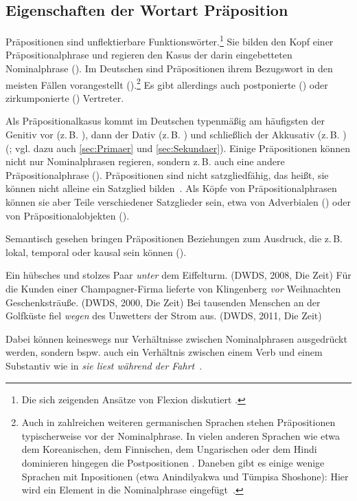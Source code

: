\subsection{Eigenschaften der Wortart Präposition} \label{sec:Wortart}
Präpositionen sind unflektierbare Funktionswörter.\footnote{Die sich zeigenden Ansätze von Flexion diskutiert \citet{Nubling2005}.} 
Sie bilden den Kopf einer Pr{\"a}positionalphrase und regieren den Kasus der darin eingebetteten Nominalphrase (\cites[s.][630]{Griehaber2009}[182]{Eisenberg.2013}). 
Im Deutschen sind Präpositionen ihrem Bezugswort in den meisten Fällen vorangestellt ().\footnote{Auch in zahlreichen weiteren germanischen Sprachen stehen Präpositionen typischerweise vor der Nominalphrase. In vielen anderen Sprachen wie etwa dem Koreanischen, dem Finnischen, dem Ungarischen oder dem Hindi dominieren hingegen die Postpositionen \citep[s.][]{Dryer2013}. 
Daneben gibt es einige wenige Sprachen mit Inpositionen (etwa Anindilyakwa und Tümpisa Shoshone): Hier wird ein Element in die Nominalphrase eingefügt~\citep[s.][]{Dryer2013}.}
Es gibt allerdings auch postponierte () oder zirkumponierte () Vertreter. 

Als Präpositionalkasus kommt im Deutschen typenmäßig am häufigsten der Genitiv vor (z.\,B. ), dann der Dativ (z.\,B. ) und schließlich der Akkusativ (z.\,B. ) (\cites[s. etwa][131--132]{Eroms1981}[638]{Griehaber2009}; vgl. dazu auch \autoref{sec:Primaer} und \autoref{sec:Sekundaer}). 
Einige Präpositionen können nicht nur Nominalphrasen regieren, sondern z.\,B. auch eine andere Präpositionalphrase (). 
Pr{\"a}positionen sind nicht satzgliedf{\"a}hig, das hei{\ss}t, sie k{\"o}nnen nicht alleine ein Satzglied bilden~\citep[s.][633]{Griehaber2009}.
Als Köpfe von Präpositionalphrasen können sie aber Teile verschiedener Satzglieder sein, etwa von Adverbialen () oder von Präpositionalobjekten (). 

Semantisch gesehen bringen Präpositionen Beziehungen zum Ausdruck, die z.\,B. lokal, temporal oder kausal sein können (\cites[ausführlich dazu][]{Eroms1981}[s. außerdem][365--366]{Jung1980}[51--53, 55]{Rauh1990}). 
\begin{exe}
\ex Ein hübsches und stolzes Paar \emph{unter} dem Eiffelturm. (DWDS, 2008, Die Zeit)
\ex Für die Kunden einer Champagner-Firma lieferte von Klingenberg \emph{vor} Weihnachten Geschenksträuße. (DWDS, 2000, Die Zeit) 
\ex Bei tausenden Menschen an der Golfküste fiel \emph{wegen} des Unwetters der Strom aus. (DWDS, 2011, Die Zeit)
\end{exe}
Dabei können keineswegs nur Verhältnisse zwischen Nominalphrasen ausgedrückt werden, sondern bspw. auch ein Verh{\"a}ltnis zwischen einem Verb und einem Substantiv wie in \textit{sie liest w{\"a}hrend der Fahrt}~\citep[s.][41]{Romare.2004}.

